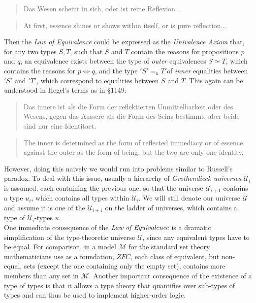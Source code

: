 \documentclass{article}
\begin{document}
\begin{quote}
    Das Wesen scheint in sich, oder ist  reine Reflexion...
\end{quote}

\begin{quote}
    At first, essence shines or shows within itself, or is pure reflection...
\end{quote}

Then the \emph{Law of Equivalence} could be expressed as the \emph{Univalence Axiom} that, for any two
types $S,T$, such that $S$ and $T$ contain the reasons for propositions $p$ and $q$, an equivalence
exists between the type of  \emph{outer} equivalences $S\simeq T$, which contains the reasons for 
$p\Leftrightarrow q$, and the type $'S'=_{u}  T'$of \emph{inner} equalities 
between $'S'$ and $'T'$, which correspond to equalities between $S$ and $T$. This again can be understood in 
Hegel's terms
as in §1149:

\begin{quote}
    Das innere ist als die Form der reflektierten Unmittelbarkeit oder des Wesens, gegen das Aussere als
die Form des Seins bestimmt, aber beide sind nur eine Identitaet.
\end{quote}

\begin{quote}
    The inner is determined as the form of reflected immediacy or of essence against the outer as the
form of being, but the two are only one identity.
\end{quote}

However, doing this naively we would run into problems similar to Russell's paradox. To deal with this
issue, usually a hierarchy of \emph{Grothendieck universes} $\mathcal{U}_i$ is assumed, each containing
the previous one, so that the universe $\mathcal{U}_{i+1}$ contains a type $u_i$, which contains
all types within $\mathcal{U}_i$. We will still denote our universe $\mathcal{U}$ and assume it is one
of the $\mathcal{U}_{i+1}$ on the ladder of universes, which contains a type of $\mathcal{U}_i$-types $u$.
\\

One immediate consequence of the $\emph{Law of Equivalence}$ is a dramatic simplification of the type-theoretic
universe $\mathcal{U}$, since any equivalent types have to be equal. For comparison, in a model $\mathcal{M}$
for the standard set theory mathematicians use as a foundation, $ZFC$, each class of equivalent, but non-equal,
sets (except the one containing only the empty set), contains more members than any set in $\mathcal{M}$.
Another important consequence of the existence of a type of types is that it allows a type theory that
quantifies over sub-types of types and can thus be used to implement higher-order logic. 
\end{document}
